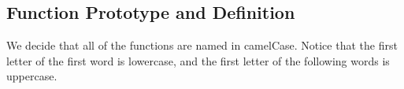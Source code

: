\subsection{Function Prototype and Definition}
\hspace{1cm} We decide that all of the functions are named in camelCase. Notice that the first letter of the first word is lowercase, and the first letter of the following words is uppercase.
